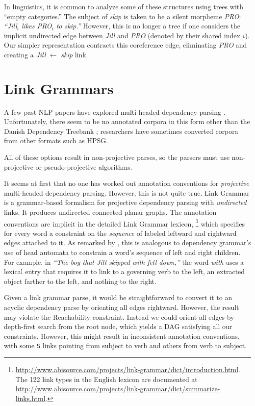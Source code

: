 \documentclass[11pt]{article}
\begin{document}
In linguistics, it is common to analyze some of these structures using trees with ``empty categories.''  The subject of {\em skip} is taken to be a silent morpheme {\em PRO}:
{\em ``Jill$_i$ likes PRO$_i$ to skip.''}  However, this is no longer a tree if one considers the implicit undirected edge between {\em Jill} and {\em PRO} (denoted by their shared index $i$).  Our simpler representation contracts this coreference edge, eliminating {\em PRO} and creating a {\em Jill} $\leftarrow$ {\em skip} link.  

\section{Link Grammars}

A few past NLP papers have explored multi-headed dependency parsing \cite{buchkromann-2006,mcdonald-pereira-2006,sagae-tsujii-2008,gomezrodriguez-nivre-2013}.  Unfortunately, there seem to be no annotated corpora in this form other than the Danish Dependency Treebank \cite{kromann-2003}; researchers have sometimes converted corpora from other formats such as HPSG.  

All of these options result in non-projective parses, so the parsers must use non-projective or pseudo-projective algorithms.

It seems at first that no one has worked out annotation conventions for {\em projective} multi-headed dependency parsing.  However, this is not quite true.  Link Grammar \cite{SleatorTemperly91} is a grammar-based formalism for projective dependency parsing with {\em undirected} links.  It produces undirected connected planar graphs.  The annotation conventions are implicit in the detailed Link Grammar lexicon,%
\footnote{\url{http://www.abisource.com/projects/link-grammar/dict/introduction.html}.  The 122 link types in the English lexicon are documented at \url{http://www.abisource.com/projects/link-grammar/dict/summarize-links.html}.} 
which specifies for every word a constraint on the {\em sequence} of labeled leftward and rightward edges attached to it.  As remarked by , this is analogous to dependency grammar's use of head automata to constrain a word's sequence of left and right children.  For example, in {\em ``The boy that Jill skipped with fell down,''} the word {\em with} uses a lexical entry that requires it to link to a governing verb to the left, an extracted object farther to the left, and nothing to the right.

Given a link grammar parse, it would be straightforward to convert it to an acyclic dependency parse by orienting all edges rightward.  However, the result may violate the {\sc Reachability} constraint.  Instead we could orient all edges by depth-first search from the root node, which yields a DAG satisfying all our constraints.  However, this might result in inconsistent annotation conventions, with some \texttt{S} links pointing from subject to verb and others from verb to subject.  
\end{document}
